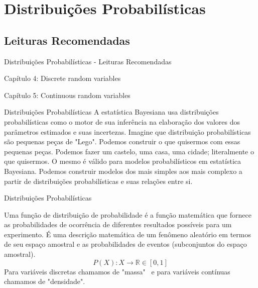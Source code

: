 \section{Distribuições Probabilísticas}

\subsection{Leituras Recomendadas}
\begin{frame}{Distribuições Probabilísticas - Leituras Recomendadas}
    \begin{vfilleditems}
        \item \textcite{dekkingModernIntroductionProbability2010}
        \begin{vfilleditems}
            \item Capítulo 4: Discrete random variables
            \item Capítulo 5: Continuous random variables
        \end{vfilleditems}
        \item \textcite{betancourtProbabilisticBuildingBlocks2019}
    \end{vfilleditems}
\end{frame}

\begin{frame}{Distribuições Probabilísticas}
    A estatística Bayesiana usa distribuições probabilísticas como o motor de sua inferência na elaboração dos
    valores dos parâmetros estimados e suas incertezas.
    \vfill
    Imagine que distribuição probabilísticas são pequenas peças de "Lego". Podemos construir o que quisermos com
    essas pequenas peças. Podemos fazer um castelo, uma casa, uma cidade; literalmente o que quisermos. O mesmo é
    válido para modelos probabilísticos em estatística Bayesiana. Podemos construir modelos dos mais simples aos mais
    complexo a partir de distribuições probabilísticas e suas relações entre si.
\end{frame}

\begin{frame}{Distribuições Probabilísticas}
    \begin{defn}
        Uma função de distribuição de probabilidade é a função matemática que fornece as probabilidades de ocorrência
        de diferentes resultados possíveis para um experimento. É uma descrição matemática de um fenômeno
        aleatório em termos de seu espaço amostral e as probabilidades de eventos (subconjuntos do espaço amostral).
        $$P(X): X \to \mathbb{R} \in [0, 1]$$
        Para variáveis discretas chamamos de "massa"~
        e para variáveis contínuas chamamos de "densidade".
    \end{defn}
\end{frame}

